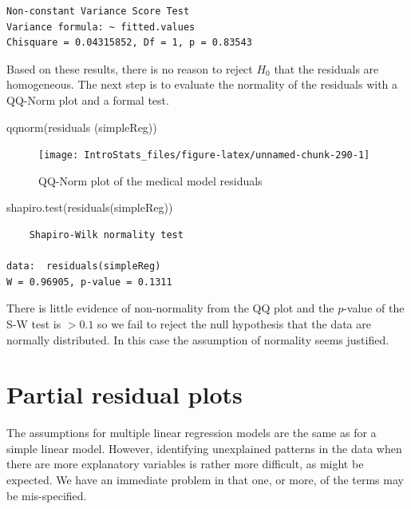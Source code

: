 \documentclass[
  oneside]{krantz}
\newenvironment{Shaded}{\begin{snugshade}}{\end{snugshade}}
\newcommand{\FunctionTok}[1]{\textcolor[rgb]{0.00,0.00,0.00}{#1}}
\newcommand{\NormalTok}[1]{#1}
\begin{document}
\begin{verbatim}
Non-constant Variance Score Test 
Variance formula: ~ fitted.values 
Chisquare = 0.04315852, Df = 1, p = 0.83543
\end{verbatim}

Based on these results, there is no reason to reject \(H_0\) that the residuals are homogeneous. The next step is to evaluate the normality of the residuals with a QQ-Norm plot and a formal test.

\begin{Shaded}
\begin{Highlighting}[]
 \FunctionTok{qqnorm}\NormalTok{(}\FunctionTok{residuals}\NormalTok{ (simpleReg))}
\end{Highlighting}
\end{Shaded}

\begin{figure}

{\centering \texttt{[image: IntroStats\_files/figure-latex/unnamed-chunk-290-1]} 

}

\caption{QQ-Norm plot of the medical model residuals}\label{fig:unnamed-chunk-290}
\end{figure}

\begin{Shaded}
\begin{Highlighting}[]
\FunctionTok{shapiro.test}\NormalTok{(}\FunctionTok{residuals}\NormalTok{(simpleReg))}
\end{Highlighting}
\end{Shaded}

\begin{verbatim}
    Shapiro-Wilk normality test

data:  residuals(simpleReg)
W = 0.96905, p-value = 0.1311
\end{verbatim}

There is little evidence of non-normality from the QQ plot and the \(p\)-value of the S-W test is \(>0.1\) so we fail to reject the null hypothesis that the data are normally distributed. In this case the assumption of normality seems justified.

\hypertarget{partial-residual-plots}{%
\section{Partial residual plots}\label{partial-residual-plots}}

The assumptions for multiple linear regression models are the same as for a simple linear model. However, identifying unexplained patterns in the data when there are more explanatory variables is rather more difficult, as might be expected. We have an immediate problem in that one, or more, of the terms may be mis-specified.
\end{document}
